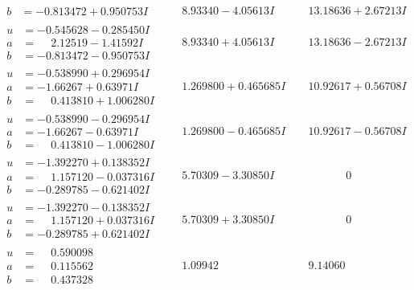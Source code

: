\documentclass[1p]{elsarticle_modified}
\theoremstyle{definition}
\begin{document}
$$\begin{array}{c|c|c}
\begin{aligned}
b &= -0.813472 + 0.950753 I\end{aligned}
 & \phantom{-}8.93340 - 4.05613 I & \phantom{-}13.18636 + 2.67213 I \\ \hline\begin{aligned}
u &= -0.545628 - 0.285450 I \\
a &= \phantom{-}2.12519 - 1.41592 I \\
b &= -0.813472 - 0.950753 I\end{aligned}
 & \phantom{-}8.93340 + 4.05613 I & \phantom{-}13.18636 - 2.67213 I \\ \hline\begin{aligned}
u &= -0.538990 + 0.296954 I \\
a &= -1.66267 + 0.63971 I \\
b &= \phantom{-}0.413810 + 1.006280 I\end{aligned}
 & \phantom{-}1.269800 + 0.465685 I & \phantom{-}10.92617 + 0.56708 I \\ \hline\begin{aligned}
u &= -0.538990 - 0.296954 I \\
a &= -1.66267 - 0.63971 I \\
b &= \phantom{-}0.413810 - 1.006280 I\end{aligned}
 & \phantom{-}1.269800 - 0.465685 I & \phantom{-}10.92617 - 0.56708 I \\ \hline\begin{aligned}
u &= -1.392270 + 0.138352 I \\
a &= \phantom{-}1.157120 - 0.037316 I \\
b &= -0.289785 - 0.621402 I\end{aligned}
 & \phantom{-}5.70309 - 3.30850 I & \phantom{-0.000000 } 0 \\ \hline\begin{aligned}
u &= -1.392270 - 0.138352 I \\
a &= \phantom{-}1.157120 + 0.037316 I \\
b &= -0.289785 + 0.621402 I\end{aligned}
 & \phantom{-}5.70309 + 3.30850 I & \phantom{-0.000000 } 0 \\ \hline\begin{aligned}
u &= \phantom{-}0.590098\phantom{ +0.000000I} \\
a &= \phantom{-}0.115562\phantom{ +0.000000I} \\
b &= \phantom{-}0.437328\phantom{ +0.000000I}\end{aligned}
 & \phantom{-}1.09942\phantom{ +0.000000I} & \phantom{-}9.14060\phantom{ +0.000000I} \\ \hline\begin{aligned}

\end{aligned}
\end{array}$$
\end{document}
